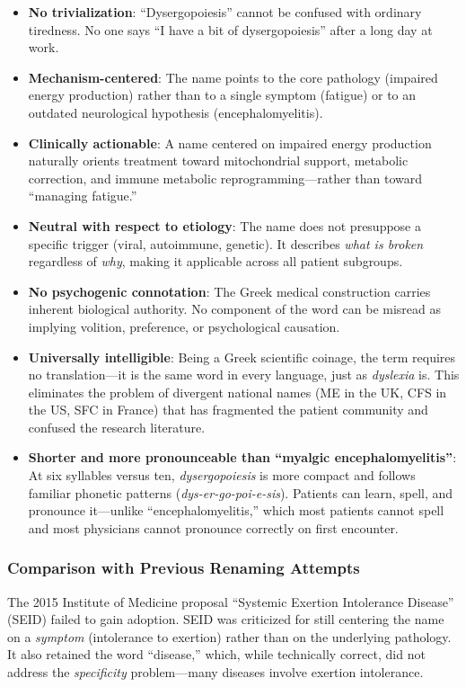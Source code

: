 \begin{itemize}
    \item \textbf{No trivialization}: ``Dysergopoiesis'' cannot be confused with ordinary tiredness. No one says ``I have a bit of dysergopoiesis'' after a long day at work.
    \item \textbf{Mechanism-centered}: The name points to the core pathology (impaired energy production) rather than to a single symptom (fatigue) or to an outdated neurological hypothesis (encephalomyelitis).
    \item \textbf{Clinically actionable}: A name centered on impaired energy production naturally orients treatment toward mitochondrial support, metabolic correction, and immune metabolic reprogramming---rather than toward ``managing fatigue.''
    \item \textbf{Neutral with respect to etiology}: The name does not presuppose a specific trigger (viral, autoimmune, genetic). It describes \emph{what is broken} regardless of \emph{why}, making it applicable across all patient subgroups.
    \item \textbf{No psychogenic connotation}: The Greek medical construction carries inherent biological authority. No component of the word can be misread as implying volition, preference, or psychological causation.
    \item \textbf{Universally intelligible}: Being a Greek scientific coinage, the term requires no translation---it is the same word in every language, just as \emph{dyslexia} is. This eliminates the problem of divergent national names (ME in the UK, CFS in the US, SFC in France) that has fragmented the patient community and confused the research literature.
    \item \textbf{Shorter and more pronounceable than ``myalgic encephalomyelitis''}: At six syllables versus ten, \emph{dysergopoiesis} is more compact and follows familiar phonetic patterns (\emph{dys-er-go-poi-e-sis}). Patients can learn, spell, and pronounce it---unlike ``encephalomyelitis,'' which most patients cannot spell and most physicians cannot pronounce correctly on first encounter.
\end{itemize}

\subsubsection{Comparison with Previous Renaming Attempts}

The 2015 Institute of Medicine proposal ``Systemic Exertion Intolerance Disease'' (SEID) failed to gain adoption. SEID was criticized for still centering the name on a \emph{symptom} (intolerance to exertion) rather than on the underlying pathology. It also retained the word ``disease,'' which, while technically correct, did not address the \emph{specificity} problem---many diseases involve exertion intolerance.

